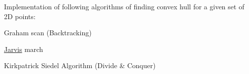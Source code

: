 Implementation of following algorithms of finding convex hull for a given set of 2D points\+:


\begin{DoxyItemize}
\item Graham scan (Backtracking)
\item \mbox{\hyperlink{classJarvis}{Jarvis}} march
\item Kirkpatrick Siedel Algorithm (Divide \& Conquer) 
\end{DoxyItemize}